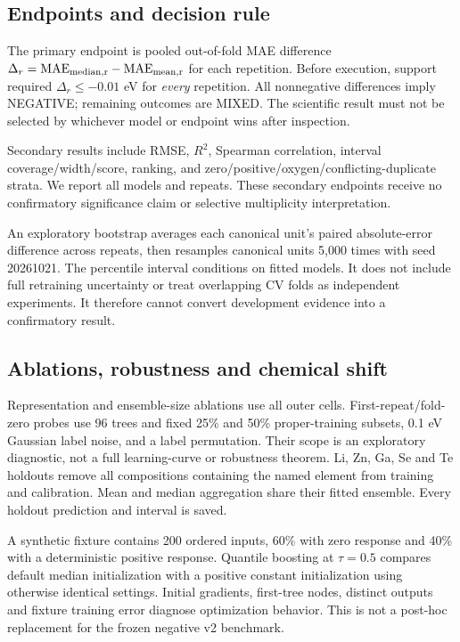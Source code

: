 \documentclass[11pt]{article}
\begin{document}
\subsection{Endpoints and decision rule}
The primary endpoint is pooled out-of-fold MAE difference $\Delta_r=\mathrm{MAE}_{\rm median,r}-\mathrm{MAE}_{\rm mean,r}$ for each repetition. Before execution, support required $\Delta_r\leq-0.01$ eV for \emph{every} repetition. All nonnegative differences imply NEGATIVE; remaining outcomes are MIXED. The scientific result must not be selected by whichever model or endpoint wins after inspection.

Secondary results include RMSE, $R^2$, Spearman correlation, interval coverage/width/score, ranking, and zero/positive/oxygen/conflicting-duplicate strata. We report all models and repeats. These secondary endpoints receive no confirmatory significance claim or selective multiplicity interpretation.

An exploratory bootstrap averages each canonical unit's paired absolute-error difference across repeats, then resamples canonical units 5,000 times with seed 20261021. The percentile interval conditions on fitted models. It does not include full retraining uncertainty or treat overlapping CV folds as independent experiments. It therefore cannot convert development evidence into a confirmatory result.

\subsection{Ablations, robustness and chemical shift}
Representation and ensemble-size ablations use all outer cells. First-repeat/fold-zero probes use 96 trees and fixed 25\% and 50\% proper-training subsets, 0.1 eV Gaussian label noise, and a label permutation. Their scope is an exploratory diagnostic, not a full learning-curve or robustness theorem. Li, Zn, Ga, Se and Te holdouts remove all compositions containing the named element from training and calibration. Mean and median aggregation share their fitted ensemble. Every holdout prediction and interval is saved.

A synthetic fixture contains 200 ordered inputs, 60\% with zero response and 40\% with a deterministic positive response. Quantile boosting at $\tau=0.5$ compares default median initialization with a positive constant initialization using otherwise identical settings. Initial gradients, first-tree nodes, distinct outputs and fixture training error diagnose optimization behavior. This is not a post-hoc replacement for the frozen negative v2 benchmark.
\end{document}

